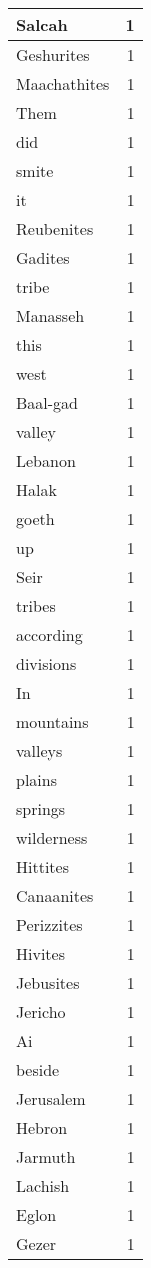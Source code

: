 \begin{center}
\begin{longtable}{l|r}
Salcah & 1 \\ \hline
Geshurites & 1 \\ \hline
Maachathites & 1 \\ \hline
Them & 1 \\ \hline
did & 1 \\ \hline
smite & 1 \\ \hline
it & 1 \\ \hline
Reubenites & 1 \\ \hline
Gadites & 1 \\ \hline
tribe & 1 \\ \hline
Manasseh & 1 \\ \hline
this & 1 \\ \hline
west & 1 \\ \hline
Baal-gad & 1 \\ \hline
valley & 1 \\ \hline
Lebanon & 1 \\ \hline
Halak & 1 \\ \hline
goeth & 1 \\ \hline
up & 1 \\ \hline
Seir & 1 \\ \hline
tribes & 1 \\ \hline
according & 1 \\ \hline
divisions & 1 \\ \hline
In & 1 \\ \hline
mountains & 1 \\ \hline
valleys & 1 \\ \hline
plains & 1 \\ \hline
springs & 1 \\ \hline
wilderness & 1 \\ \hline
Hittites & 1 \\ \hline
Canaanites & 1 \\ \hline
Perizzites & 1 \\ \hline
Hivites & 1 \\ \hline
Jebusites & 1 \\ \hline
Jericho & 1 \\ \hline
Ai & 1 \\ \hline
beside & 1 \\ \hline
Jerusalem & 1 \\ \hline
Hebron & 1 \\ \hline
Jarmuth & 1 \\ \hline
Lachish & 1 \\ \hline
Eglon & 1 \\ \hline
Gezer & 1 \\ \hline

\end{longtable}
\end{center}
